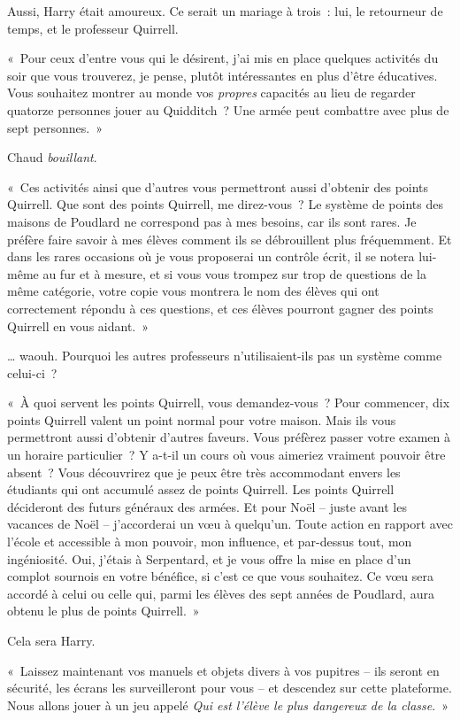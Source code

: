 Aussi, Harry était amoureux. Ce serait un mariage à trois~: lui, le retourneur de temps, et le professeur Quirrell.

«~Pour ceux d'entre vous qui le désirent, j'ai mis en place quelques activités du soir que vous trouverez, je pense, plutôt intéressantes en plus d'être éducatives.
Vous souhaitez montrer au monde vos \emph{propres} capacités au lieu de regarder quatorze personnes jouer au Quidditch~?
Une armée peut combattre avec plus de sept personnes.~»

Chaud \emph{bouillant}.

«~Ces activités ainsi que d'autres vous permettront aussi d'obtenir des points Quirrell.
Que sont des points Quirrell, me direz-vous~?
Le système de points des maisons de Poudlard ne correspond pas à mes besoins, car ils sont rares.
Je préfère faire savoir à mes élèves comment ils se débrouillent plus fréquemment.
Et dans les rares occasions où je vous proposerai un contrôle écrit, il se notera lui-même au fur et à mesure, et si vous vous trompez sur trop de questions de la même catégorie, votre copie vous montrera le nom des élèves qui ont correctement répondu à ces questions, et ces élèves pourront gagner des points Quirrell en vous aidant.~»

… waouh. Pourquoi les autres professeurs n'utilisaient-ils pas un système comme celui-ci~?

«~À quoi servent les points Quirrell, vous demandez-vous~?
Pour commencer, dix points Quirrell valent un point normal pour votre maison.
Mais ils vous permettront aussi d'obtenir d'autres faveurs.
Vous préfèrez passer votre examen à un horaire particulier~?
Y a-t-il un cours où vous aimeriez vraiment pouvoir être absent~?
Vous découvrirez que je peux être très accommodant envers les étudiants qui ont accumulé assez de points Quirrell.
Les points Quirrell décideront des futurs généraux des armées.
Et pour Noël -- juste avant les vacances de Noël -- j'accorderai un vœu à quelqu'un.
Toute action en rapport avec l'école et accessible à mon pouvoir, mon influence, et par-dessus tout, mon ingéniosité.
Oui, j'étais à Serpentard, et je vous offre la mise en place d'un complot sournois en votre bénéfice, si c'est ce que vous souhaitez.
Ce vœu sera accordé à celui ou celle qui, parmi les élèves des sept années de Poudlard, aura obtenu le plus de points Quirrell.~»

Cela sera Harry.

«~Laissez maintenant vos manuels et objets divers à vos pupitres -- ils seront en sécurité, les écrans les surveilleront pour vous -- et descendez sur cette plateforme.
Nous allons jouer à un jeu appelé \emph{Qui est l'élève le plus dangereux de la classe}.~»

